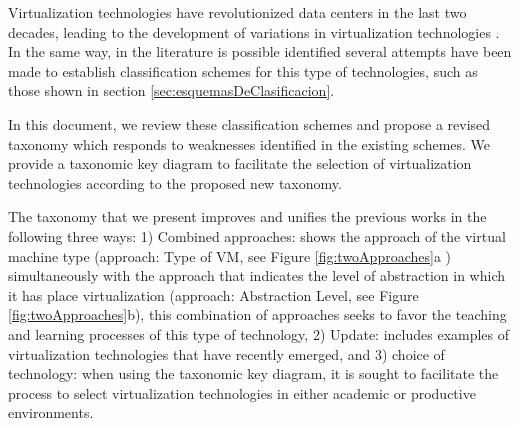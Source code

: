 	
	
	
    Virtualization technologies have revolutionized data centers in the last two decades, leading to the development of variations in virtualization technologies \cite{Kampert2010}. In the same way, in the literature is possible identified several attempts have been made to establish classification schemes for this type of technologies, such as those shown in section \ref{sec:esquemasDeClasificacion}.
    
    
    
    In this document, we review these classification schemes and propose a revised taxonomy which responds to weaknesses identified in the existing schemes. We provide a taxonomic key diagram to facilitate the selection of virtualization technologies according to the proposed new taxonomy.
    
    The taxonomy that we present improves and unifies the previous works in the following three ways: 1) Combined approaches: shows the approach of the virtual machine type (approach: Type of VM, see Figure \ref{fig:twoApproaches}a ) simultaneously with the approach that indicates the level of abstraction in which it has place virtualization (approach: Abstraction Level, see Figure \ref{fig:twoApproaches}b), this combination of approaches seeks to favor the teaching and learning processes of this type of technology, 2) Update: includes examples of virtualization technologies that have recently emerged, and 3) choice of technology: when using the taxonomic key diagram, it is sought to facilitate the process to select virtualization technologies in either academic or productive environments.

